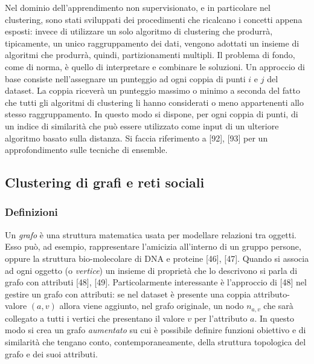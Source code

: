 Nel dominio dell'apprendimento non supervisionato, e in particolare nel clustering, sono stati sviluppati dei procedimenti che ricalcano i concetti appena esposti: invece di utilizzare un solo algoritmo di clustering che produrr\`a, tipicamente, un unico raggruppamento dei dati, vengono adottati un insieme di algoritmi che produrr\`a, quindi, partizionamenti multipli. Il problema di fondo, come di norma, \`e quello di interpretare e combinare le soluzioni. Un approccio di base consiste nell'assegnare un punteggio ad ogni coppia di punti $ i $ e $ j $ del dataset. La coppia ricever\`a un punteggio massimo o minimo a seconda del fatto che tutti gli algoritmi di clustering li hanno considerati o meno appartenenti allo stesso raggruppamento. In questo modo si dispone, per ogni coppia di punti, di un indice di similarit\`a che pu\`o essere utilizzato come input di un ulteriore algoritmo basato sulla distanza. Si faccia riferimento a [92], [93] per un approfondimento sulle tecniche di ensemble.

\subsection{Clustering di grafi e reti sociali}
\subsubsection{Definizioni}
Un \textit{grafo} \`e una struttura matematica usata per modellare relazioni tra oggetti. Esso pu\`o, ad esempio, rappresentare l'amicizia all'interno di un gruppo persone, oppure la struttura bio-molecolare di DNA e proteine [46], [47]. Quando si associa ad ogni oggetto (o \textit{vertice}) un insieme di propriet\`a che lo descrivono si parla di grafo con attributi  [48], [49]. Particolarmente interessante \`e l'approccio di [48] nel gestire un grafo con attributi: se nel dataset \`e presente una coppia attributo-valore $ (a, v) $ allora viene aggiunto, nel grafo originale, un nodo $ n_{a,v} $ che sar\`a collegato a tutti i vertici che presentano il valore $ v $ per l'attributo $ a $. In questo modo si crea un grafo \textit{aumentato} su cui \`e possibile definire funzioni obiettivo e di similarit\`a che tengano conto, contemporaneamente, della struttura topologica del grafo e dei suoi attributi.

